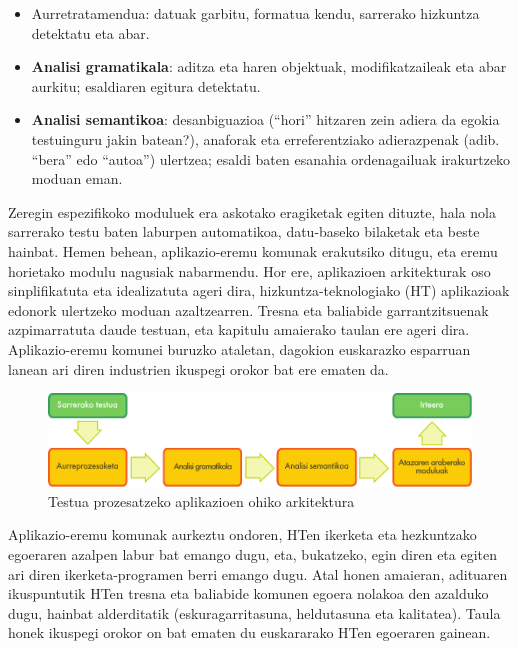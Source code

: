 \begin{multicols}{2}
    \begin{itemize}
      \item Aurretratamendua: datuak garbitu, formatua kendu, sarrerako hizkuntza detektatu eta abar. 
      \item \textbf{Analisi gramatikala}: aditza eta haren objektuak, modifikatzaileak eta abar aurkitu; esaldiaren egitura detektatu.
      \item \textbf{Analisi semantikoa}: desanbiguazioa (“hori” hitzaren zein adiera da egokia testuinguru jakin batean?), anaforak eta erreferentziako adierazpenak (adib. “bera” edo “autoa”) ulertzea; esaldi baten esanahia ordenagailuak irakurtzeko moduan eman.
    \end{itemize}
    Zeregin espezifikoko moduluek era askotako eragiketak egiten dituzte, hala nola sarrerako testu baten laburpen automatikoa, datu-baseko bilaketak eta beste hainbat. Hemen behean, aplikazio-eremu komunak erakutsiko ditugu, eta eremu horietako modulu nagusiak nabarmendu. Hor ere, aplikazioen arkitekturak oso sinplifikatuta eta idealizatuta ageri dira, hizkuntza-teknologiako (HT) aplikazioak edonork ulertzeko moduan azaltzearren. Tresna eta baliabide garrantzitsuenak azpimarratuta daude testuan, eta kapitulu amaierako taulan ere ageri dira. Aplikazio-eremu komunei buruzko ataletan, dagokion euskarazko esparruan lanean ari diren industrien ikuspegi orokor bat ere ematen da.
\begin{figure}[b]
  \center
  \vspace{-5mm} \includegraphics[width=\textwidth]{../_media/basque/text_processing_app_architecture}
  \caption{Testua prozesatzeko aplikazioen ohiko arkitektura}
  \label{fig:textprocessingarch_eu}
\end{figure}

Aplikazio-eremu komunak aurkeztu ondoren, HTen ikerketa eta hezkuntzako egoeraren azalpen labur bat emango dugu, eta, bukatzeko, egin diren eta egiten ari diren ikerketa-programen berri emango dugu. Atal honen amaieran, adituaren ikuspuntutik HTen tresna eta baliabide komunen egoera nolakoa den azalduko dugu, hainbat alderditatik (eskuragarritasuna, heldutasuna eta kalitatea). Taula honek ikuspegi orokor on bat ematen du euskararako HTen egoeraren gainean.  


\end{multicols}

